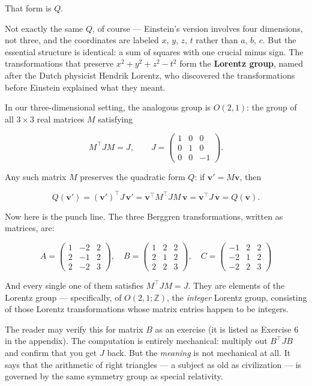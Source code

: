 \documentclass[12pt, letterpaper, openany]{book}
\theoremstyle{definition}
\theoremstyle{remark}
\begin{document}
That form is $Q$.

Not exactly the same $Q$, of course --- Einstein's version involves four dimensions, not three, and the coordinates are labeled $x$, $y$, $z$, $t$ rather than $a$, $b$, $c$. But the essential structure is identical: a sum of squares with one crucial minus sign. The transformations that preserve $x^2 + y^2 + z^2 - t^2$ form the \textbf{Lorentz group}, named after the Dutch physicist Hendrik Lorentz, who discovered the transformations before Einstein explained what they meant.

In our three-dimensional setting, the analogous group is $O(2,1)$: the group of all $3 \times 3$ real matrices $M$ satisfying

\[
M^\top J M = J, \qquad J = \begin{pmatrix} 1 & 0 & 0 \\ 0 & 1 & 0 \\ 0 & 0 & -1 \end{pmatrix}.
\]

Any such matrix $M$ preserves the quadratic form $Q$: if $\mathbf{v}' = M\mathbf{v}$, then

\[
Q(\mathbf{v}') = (\mathbf{v}')^\top J\, \mathbf{v}' = \mathbf{v}^\top M^\top J M\, \mathbf{v} = \mathbf{v}^\top J\, \mathbf{v} = Q(\mathbf{v}).
\]

Now here is the punch line. The three Berggren transformations, written as matrices, are:

\[
A = \begin{pmatrix} 1 & -2 & 2 \\ 2 & -1 & 2 \\ 2 & -2 & 3 \end{pmatrix}, \quad B = \begin{pmatrix} 1 & 2 & 2 \\ 2 & 1 & 2 \\ 2 & 2 & 3 \end{pmatrix}, \quad C = \begin{pmatrix} -1 & 2 & 2 \\ -2 & 1 & 2 \\ -2 & 2 & 3 \end{pmatrix}
\]

And every single one of them satisfies $M^\top J M = J$. They are elements of the Lorentz group --- specifically, of $O(2,1; \mathbb{Z})$, the \textit{integer} Lorentz group, consisting of those Lorentz transformations whose matrix entries happen to be integers.

The reader may verify this for matrix $B$ as an exercise (it is listed as Exercise 6 in the appendix). The computation is entirely mechanical: multiply out $B^\top J B$ and confirm that you get $J$ back. But the \textit{meaning} is not mechanical at all. It says that the arithmetic of right triangles --- a subject as old as civilization --- is governed by the same symmetry group as special relativity.
\end{document}
